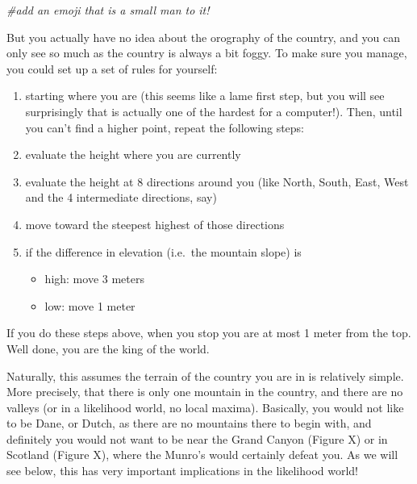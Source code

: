 \documentclass[
]{book}
\newenvironment{Shaded}{\begin{snugshade}}{\end{snugshade}}
\newcommand{\CommentTok}[1]{\textcolor[rgb]{0.56,0.35,0.01}{\textit{#1}}}
\providecommand{\tightlist}{%
  \setlength{\itemsep}{0pt}\setlength{\parskip}{0pt}}
\begin{document}
\begin{Shaded}
\begin{Highlighting}[]
\CommentTok{#add an emoji that is a small man to it!}
\end{Highlighting}
\end{Shaded}

But you actually have no idea about the orography of the country, and you can only see so much as the country is always a bit foggy. To make sure you manage, you could set up a set of rules for yourself:

\begin{enumerate}
\def\labelenumi{\arabic{enumi}.}
\tightlist
\item
  starting where you are (this seems like a lame first step, but you will see surprisingly that is actually one of the hardest for a computer!). Then, until you can't find a higher point, repeat the following steps:
\item
  evaluate the height where you are currently
\item
  evaluate the height at 8 directions around you (like North, South, East, West and the 4 intermediate directions, say)
\item
  move toward the steepest highest of those directions
\item
  if the difference in elevation (i.e.~the mountain slope) is

  \begin{itemize}
  \tightlist
  \item
    high: move 3 meters
  \item
    low: move 1 meter
  \end{itemize}
\end{enumerate}

If you do these steps above, when you stop you are at most 1 meter from the top. Well done, you are the king of the world.

Naturally, this assumes the terrain of the country you are in is relatively simple. More precisely, that there is only one mountain in the country, and there are no valleys (or in a likelihood world, no local maxima). Basically, you would not like to be Dane, or Dutch, as there are no mountains there to begin with, and definitely you would not want to be near the Grand Canyon (Figure X) or in Scotland (Figure X), where the Munro's would certainly defeat you. As we will see below, this has very important implications in the likelihood world!
\end{document}
